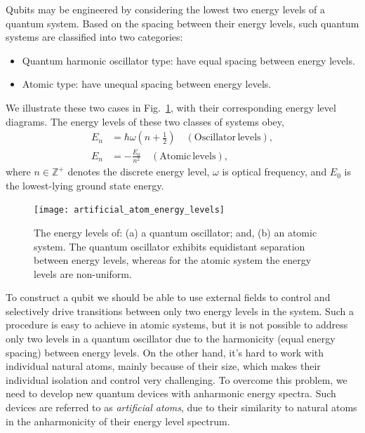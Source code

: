 Qubits may be engineered by considering the lowest two energy levels of a quantum system. Based on the spacing between their energy levels, such quantum systems are classified into two categories:
\begin{itemize}
	\item Quantum harmonic oscillator type: have equal spacing between energy levels.
	\item Atomic type: have unequal spacing between energy levels.
\end{itemize}
We illustrate these two cases in Fig.~\ref{fig:artificial_atom_energy_levels}, with their corresponding energy level diagrams. The energy levels of these two classes of systems obey,
\begin{align}
E_{n} &= \hbar \omega \left(n+\frac{1}{2}\right) \quad (\mathrm{Oscillator\,levels}), \nonumber \\ 
E_{n} &= -\frac{E_{0}}{n^{2}} \quad (\mathrm{Atomic\,levels}),
\end{align}
where \mbox{$n\in\mathbb{Z}^+$} denotes the discrete energy level, $\omega$ is optical frequency, and $E_0$ is the lowest-lying ground state energy.

\begin{figure}[!htbp]
\texttt{[image: artificial\_atom\_energy\_levels]}
\caption{The energy levels of: (a) a quantum oscillator; and, (b) an atomic system. The quantum oscillator exhibits equidistant separation between energy levels, whereas for the atomic system the energy levels are non-uniform.}\label{fig:artificial_atom_energy_levels}
\end{figure}

To construct a qubit we should be able to use external fields to control and selectively drive transitions between only two energy levels in the system. Such a procedure is easy to achieve in atomic systems, but it is not possible to address only two levels in a quantum oscillator due to the harmonicity (equal energy spacing) between energy levels. On the other hand, it's hard to work with individual natural atoms, mainly because of their size, which makes their individual isolation and control very challenging. To overcome this problem, we need to develop new quantum devices with anharmonic energy spectra. Such devices are referred to as \textit{artificial atoms}, due to their similarity to natural atoms in the anharmonicity of their energy level spectrum.

